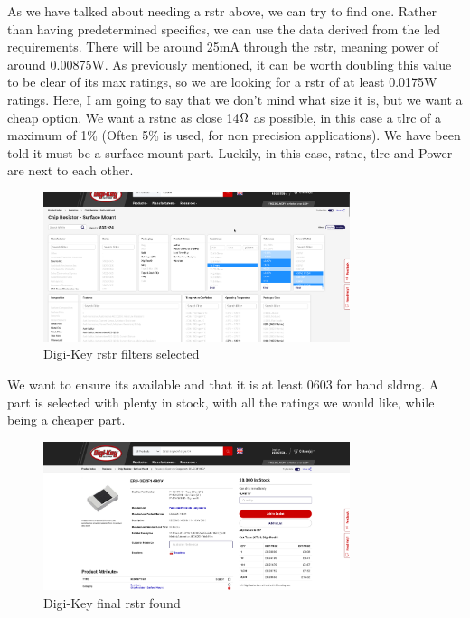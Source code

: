 \documentclass[a4paper,11pt]{report}
\begin{document}
As we have talked about needing a \gls{rstr} above, we can try to find one. Rather than having predetermined specifics, we can use the data derived from the \gls{led} requirements. There will be around 25mA through the \gls{rstr}, meaning power of around 0.00875W. As previously mentioned, it can be worth doubling this value to be clear of its max ratings, so we are looking for a \gls{rstr} of at least 0.0175W ratings. Here, I am going to say that we don't mind what size it is, but we want a cheap option. We want a \gls{rstnc} as close 14$\ohm$ as possible, in this case a \gls{tlrc} of a maximum of 1\% (Often 5\% is used, for non precision applications). We have been told it must be a surface mount part. Luckily, in this case, \gls{rstnc}, \gls{tlrc} and Power are next to each other.

\begin{figure}[H]
\centering
\includegraphics[width=0.8\textwidth]{screenshots/DigiKeyresistor}
\caption{Digi-Key \gls{rstr} filters selected}
\end{figure}

We want to ensure its available and that it is at least 0603 for hand \gls{sldrng}. A part is selected with plenty in stock, with all the ratings we would like, while being a cheaper part.

\begin{figure}[H]
\centering
\includegraphics[width=0.8\textwidth]{screenshots/DigiKeyresistorSelected}
\caption{Digi-Key final \gls{rstr} found}
\end{figure}
\end{document}
